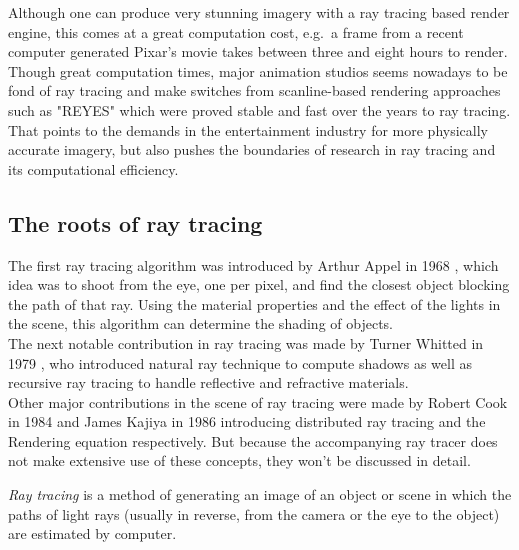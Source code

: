\documentclass{article}
\begin{document}
Although one can produce very stunning imagery with a ray tracing based render engine, this  comes at a great computation cost, e.g.\ a frame from a recent computer generated Pixar's movie takes between three and eight hours to render. \cite{pixarRentime} \\
Though great computation times, major animation studios seems nowadays to be fond of ray tracing and make switches from scanline-based rendering approaches such as "REYES" which were proved stable and fast over the years to ray tracing. \cite{pixarSwitch} That points to the demands in the entertainment industry for more physically accurate imagery, but also pushes the boundaries of research in ray tracing and its computational efficiency. \cite{disneyHyperion}

\subsection{The roots of ray tracing}
The first ray tracing algorithm was introduced by Arthur Appel in 1968 \cite{appel}, which idea was to shoot from the eye, one per pixel, and find the closest object blocking the path of that ray. Using the material properties and the effect of the lights in the scene, this algorithm can determine the shading of objects. \\
The next notable contribution in ray tracing was made by Turner Whitted in 1979 \cite{whitted}, who introduced natural ray technique to compute shadows as well as recursive ray tracing to handle reflective and refractive materials. \\
Other major contributions in the scene of ray tracing were made by Robert Cook in 1984 \cite{cook} and James Kajiya in 1986 \citep{kajiya} introducing distributed ray tracing and the Rendering equation respectively. But because the accompanying ray tracer does not make extensive use of these concepts, they won't be discussed in detail.


\textit{Ray tracing} is a method of generating an image of an object or scene in which the paths of light rays (usually in reverse, from the camera or the eye to the object) are estimated by computer. \cite{oxford_dict} 

\vspace*{\baselineskip}


\end{document}
